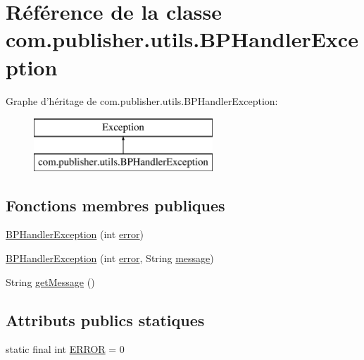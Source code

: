 \hypertarget{classcom_1_1publisher_1_1utils_1_1BPHandlerException}{\section{Référence de la classe com.\-publisher.\-utils.\-B\-P\-Handler\-Exception}
\label{classcom_1_1publisher_1_1utils_1_1BPHandlerException}
}
Graphe d'héritage de com.\-publisher.\-utils.\-B\-P\-Handler\-Exception\-:\begin{figure}[H]
\begin{center}
\leavevmode
\includegraphics[height=2.000000cm]{d3/db2/classcom_1_1publisher_1_1utils_1_1BPHandlerException}
\end{center}
\end{figure}
\subsection*{Fonctions membres publiques}
\begin{DoxyCompactItemize}
\item 
\hyperlink{classcom_1_1publisher_1_1utils_1_1BPHandlerException_a29621bd49601c323ae814695e2592fd6}{B\-P\-Handler\-Exception} (int \hyperlink{classcom_1_1publisher_1_1utils_1_1BPHandlerException_a22187f6ed53004154eead03978409a11}{error})
\item 
\hyperlink{classcom_1_1publisher_1_1utils_1_1BPHandlerException_a3c306310302b1e4dcad1cdda127cf119}{B\-P\-Handler\-Exception} (int \hyperlink{classcom_1_1publisher_1_1utils_1_1BPHandlerException_a22187f6ed53004154eead03978409a11}{error}, String \hyperlink{classcom_1_1publisher_1_1utils_1_1BPHandlerException_ad64b758d099e991b5b86d489b56e582b}{message})
\item 
String \hyperlink{classcom_1_1publisher_1_1utils_1_1BPHandlerException_aa1d1deb769bfcb3faafd48ad754764fc}{get\-Message} ()
\end{DoxyCompactItemize}
\subsection*{Attributs publics statiques}
\begin{DoxyCompactItemize}
\item 
static final int \hyperlink{classcom_1_1publisher_1_1utils_1_1BPHandlerException_a3aad32cd8b00b8e2935e58f8cac14a0f}{E\-R\-R\-O\-R} = 0
\end{DoxyCompactItemize}
